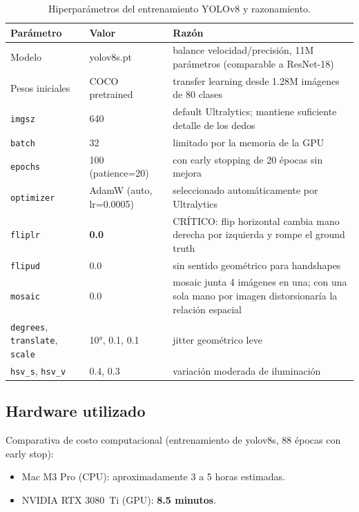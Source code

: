 \documentclass[a4paper,11pt]{article}
\begin{document}
\begin{table}[h]
\centering
\caption{Hiperparámetros del entrenamiento YOLOv8 y razonamiento.}
\label{tab:yolo-hyperparams}
\small
\begin{tabular}{p{3.2cm}p{2.8cm}>{\raggedright\arraybackslash}p{8.5cm}}
\toprule
\textbf{Parámetro} & \textbf{Valor} & \textbf{Razón} \\
\midrule
Modelo & yolov8s.pt & balance velocidad/precisión, 11M parámetros (comparable a ResNet-18) \\
Pesos iniciales & COCO pretrained & transfer learning desde 1.28M imágenes de 80 clases \\
\texttt{imgsz} & 640 & default Ultralytics; mantiene suficiente detalle de los dedos \\
\texttt{batch} & 32 & limitado por la memoria de la GPU \\
\texttt{epochs} & 100 (patience=20) & con early stopping de 20 épocas sin mejora \\
\texttt{optimizer} & AdamW (auto, lr=0.0005) & seleccionado automáticamente por Ultralytics \\
\texttt{fliplr} & \textbf{0.0} & CRÍTICO: flip horizontal cambia mano derecha por izquierda y rompe el ground truth \\
\texttt{flipud} & 0.0 & sin sentido geométrico para handshapes \\
\texttt{mosaic} & 0.0 & mosaic junta 4 imágenes en una; con una sola mano por imagen distorsionaría la relación espacial \\
\texttt{degrees}, \texttt{translate}, \texttt{scale} & 10°, 0.1, 0.1 & jitter geométrico leve \\
\texttt{hsv\_s}, \texttt{hsv\_v} & 0.4, 0.3 & variación moderada de iluminación \\
\bottomrule
\end{tabular}
\end{table}

\subsection{Hardware utilizado}

Comparativa de costo computacional (entrenamiento de yolov8s, 88 épocas con early stop):

\begin{itemize}[itemsep=2pt]
    \item Mac M3 Pro (CPU): aproximadamente 3 a 5 horas estimadas.
    \item NVIDIA RTX 3080~Ti (GPU): \textbf{8.5 minutos}.
\end{itemize}
\end{document}
